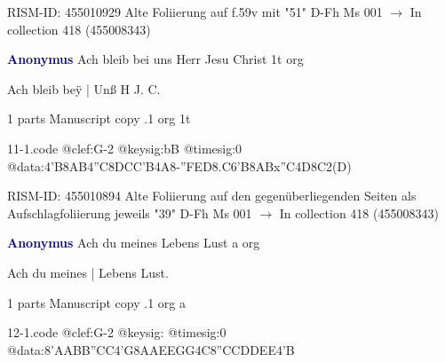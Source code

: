 \documentclass[twocolumn]{book}
\begin{document}
\newline RISM-ID: 455010929
\newline Alte Foliierung auf f.59v mit "51"
\newline D-Fh  Ms 001
\newline $\rightarrow$ In collection 418 (455008343)

\newline \par \vspace{7pt} \textcolor{darkblue}{\textbf{Anonymus  }}
\newline Ach bleib bei uns Herr Jesu Christ  1t  
\newline org
\newline \begin{itshape}[f.39v, at left:] Ach bleib beÿ | Unß H J. C.\end{itshape} 
\newline \textcolor{darkblue}{}  1 parts  
\newline Manuscript copy
.1  org  1t  
\begin{filecontents*}{11-1.code}
@clef:G-2
@keysig:bB
@timesig:0
@data:4'B{8AB}4''C{8DC}{C'B}4A8-{''FED}{8.C6'B8AB}x''C4D8C2(D)
\end{filecontents*}
\newline
%

\newline RISM-ID: 455010894
\newline Alte Foliierung auf den gegenüberliegenden Seiten als Aufschlagfoliierung jeweils "39"
\newline D-Fh  Ms 001
\newline $\rightarrow$ In collection 418 (455008343)

\newline \par \vspace{7pt} \textcolor{darkblue}{\textbf{Anonymus  }}
\newline Ach du meines Lebens Lust  a  
\newline org
\newline \begin{itshape}[f.78v, at left:] Ach du meines | Lebens Lust.\end{itshape} 
\newline \textcolor{darkblue}{}  1 parts  
\newline Manuscript copy
.1  org  a  
\begin{filecontents*}{12-1.code}
@clef:G-2
@keysig:
@timesig:0
@data:{8'AABB}{''CC}4'G{8AAEE}{GG}4C{8''CCDD}{EE}4'B
\end{filecontents*}
\newline
%
\end{document}
